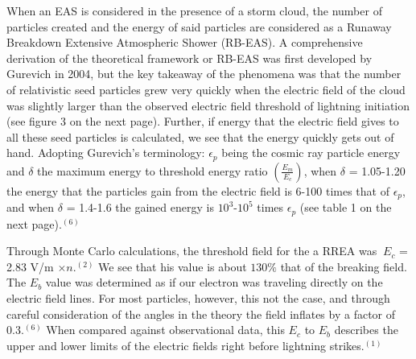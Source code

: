 \documentclass[11pt]{article}
\begin{document}
\begin{multicols*}{2}
    When an EAS is considered in the presence of a storm cloud, the number of particles created and the energy of said particles are considered as a Runaway Breakdown Extensive Atmospheric Shower (RB-EAS). A comprehensive derivation of the theoretical framework or RB-EAS was first developed by Gurevich in 2004, but the key takeaway of the phenomena was that the number of relativistic seed particles grew very quickly when the electric field of the cloud was slightly larger than the observed electric field threshold of lightning initiation (see figure 3 on the next page). Further, if energy that the electric field gives to all these seed particles is calculated, we see that the energy quickly gets out of hand. Adopting Gurevich’s terminology: $\epsilon_p$ being the cosmic ray particle energy and $\delta$ the maximum energy to threshold energy ratio $\left(\frac{E_m}{E_c}\right)$, when $\delta$ = 1.05-1.20 the energy that the particles gain from the electric field is 6-100 times that of $\epsilon_p$, and when $\delta$ = 1.4-1.6 the gained energy is $10^3$-$10^5$ times $\epsilon_p$ (see table 1 on the next page).$^{(6)}$
    
        
    Through Monte Carlo calculations, the threshold field for the a RREA was $~E_c$ = 2.83 V/m $\times n$.$^{(2)}$ We see that his value is about $130\%$ that of the breaking field. The $E_b$ value was determined as if our electron was traveling directly on the electric field lines. For most particles, however, this not the case, and through careful consideration of the angles in the theory the field inflates by a factor of $0.3$.$^{(6)}$ When compared against observational data, this $E_c$ to $E_b$ describes the upper and lower limits of the electric fields right before lightning strikes.$^{(1)}$
    

\end{multicols*}
\end{document}
